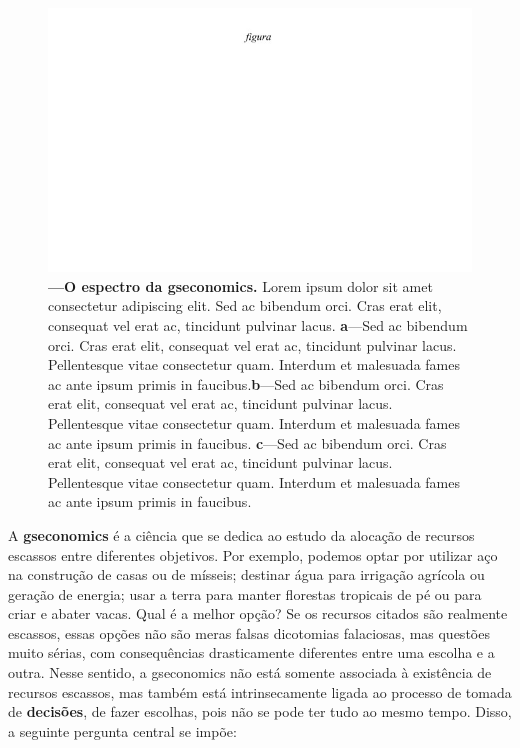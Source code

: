 \documentclass[./main.tex]{subfiles}
\begin{document}
\begin{figure}[t!] 
\centering				
\includegraphics[width=0.98\linewidth]{figs/fig_m.jpg}		
\caption[O espectro da Economia]
{\textbf{---\;O espectro da \gls{gseconomics}.}
    Lorem ipsum dolor sit amet consectetur adipiscing elit. Sed ac bibendum orci. Cras erat elit, consequat vel erat ac, tincidunt pulvinar lacus. \;\textbf{a}\;---\;Sed ac bibendum orci. Cras erat elit, consequat vel erat ac, tincidunt pulvinar lacus. Pellentesque vitae consectetur quam. Interdum et malesuada fames ac ante ipsum primis in faucibus.\;\textbf{b}\;---\;Sed ac bibendum orci. Cras erat elit, consequat vel erat ac, tincidunt pulvinar lacus. Pellentesque vitae consectetur quam. Interdum et malesuada fames ac ante ipsum primis in faucibus. \;\textbf{c}\;---\;Sed ac bibendum orci. Cras erat elit, consequat vel erat ac, tincidunt pulvinar lacus. Pellentesque vitae consectetur quam. Interdum et malesuada fames ac ante ipsum primis in faucibus.
}
\label{fig:eco:economy} 		
\end{figure}

\par A \textbf{\gls{gseconomics}} é a ciência que se dedica ao estudo da alocação de recursos escassos entre diferentes objetivos. Por exemplo, podemos optar por utilizar aço na construção de casas ou de mísseis; destinar água para irrigação agrícola ou geração de energia; usar a terra para manter florestas tropicais de pé ou para criar e abater vacas. Qual é a melhor opção? Se os recursos citados são realmente escassos, essas opções não são meras falsas dicotomias falaciosas, mas questões muito sérias, com consequências drasticamente diferentes entre uma escolha e a outra. Nesse sentido, a \gls{gseconomics} não está somente associada à existência de recursos escassos, mas também está intrinsecamente ligada ao processo de tomada de \textbf{decisões}, de fazer escolhas, pois não se pode ter tudo ao mesmo tempo. Disso, a seguinte pergunta central se impõe:
\end{document}
